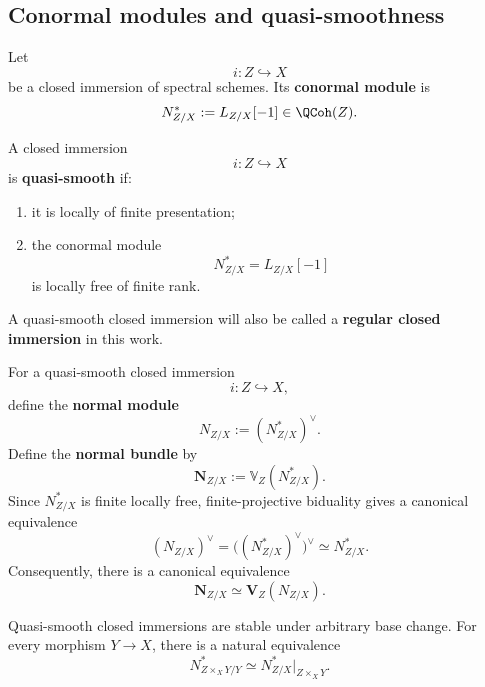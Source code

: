 \subsection{Conormal modules and quasi-smoothness}

\begin{definition}
\label{def:conormal-module}
Let
\[
    i
    \colon
    Z
    \hookrightarrow
    X
\]
be a closed immersion of spectral schemes. Its \textbf{conormal module}
is
\[
    N^*_{Z/X}
    :=
    L_{Z/X}[-1]
    \in
    \QCoh(Z).
\]
\end{definition}

\begin{definition}
\label{def:quasi-smooth-closed-immersion}
A closed immersion
\[
    i
    \colon
    Z
    \hookrightarrow
    X
\]
is \textbf{quasi-smooth} if:
\begin{enumerate}[label=(\roman*)]
    \item it is locally of finite presentation;

    \item the conormal module
    \[
        N^*_{Z/X}
        =
        L_{Z/X}[-1]
    \]
    is locally free of finite rank.
\end{enumerate}
A quasi-smooth closed immersion will also be called a
\textbf{regular closed immersion} in this work.
\end{definition}

\begin{definition}
\label{def:normal-bundle}
For a quasi-smooth closed immersion
\[
    i
    \colon
    Z
    \hookrightarrow
    X,
\]
define the \textbf{normal module}
\[
    N_{Z/X}
    :=
    (N^*_{Z/X})^\vee.
\]
Define the \textbf{normal bundle} by
\[
    \mathbf N_{Z/X}
    :=
    \mathbb V_Z(N^*_{Z/X}).
\]
Since \(N^*_{Z/X}\) is finite locally free, finite-projective biduality
gives a canonical equivalence
\[
    (N_{Z/X})^\vee
    =
    \bigl((N^*_{Z/X})^\vee\bigr)^\vee
    \simeq
    N^*_{Z/X}.
\]
Consequently, there is a canonical equivalence
\[
    \mathbf N_{Z/X}
    \simeq
    \mathbf V_Z(N_{Z/X}).
\]
\end{definition}

\begin{proposition}
\label{prop:quasi-smooth-closed-base-change}
Quasi-smooth closed immersions are stable under arbitrary base change.
For every morphism $Y\to X$, there is a natural equivalence
\[
    N^*_{Z\times_XY/Y}
    \simeq
    N^*_{Z/X}|_{Z\times_XY}.
\]
\end{proposition}

